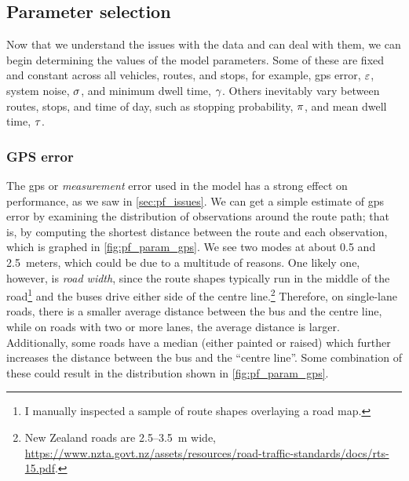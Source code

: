 \subsection{Parameter selection}
\label{sec:pf_params}

Now that we understand the issues with the data and can deal with them, we can begin determining the values of the model parameters. Some of these are fixed and constant across all vehicles, routes, and stops, for example, \gls{gps} error, $\varepsilon$, system noise, $\sigma$, and minimum dwell time, $\gamma$. Others inevitably vary between routes, stops, and time of day, such as stopping probability, $\pi$, and mean dwell time, $\tau$.


\subsubsection{GPS error}
\label{sec:pf_params_gps}

The \gls{gps} or \emph{measurement} error used in the model has a strong effect on performance, as we saw in \cref{sec:pf_issues}. We can get a simple estimate of \gls{gps} error by examining the distribution of observations around the route path; that is, by computing the shortest distance between the route and each observation, which is graphed in \cref{fig:pf_param_gps}. We see two modes at about 0.5 and 2.5~meters, which could be due to a multitude of reasons. One likely one, however, is \emph{road width}, since the route shapes typically run in the middle of the road\footnote{I manually inspected a sample of route shapes overlaying a road map.} and the buses drive either side of the centre line.\footnote{New Zealand roads are 2.5--3.5~m wide, \url{https://www.nzta.govt.nz/assets/resources/road-traffic-standards/docs/rts-15.pdf}.} Therefore, on single-lane roads, there is a smaller average distance between the bus and the centre line, while on roads with two or more lanes, the average distance is larger. Additionally, some roads have a median (either painted or raised) which further increases the distance between the bus and the ``centre line''. Some combination of these could result in the distribution shown in \cref{fig:pf_param_gps}.




